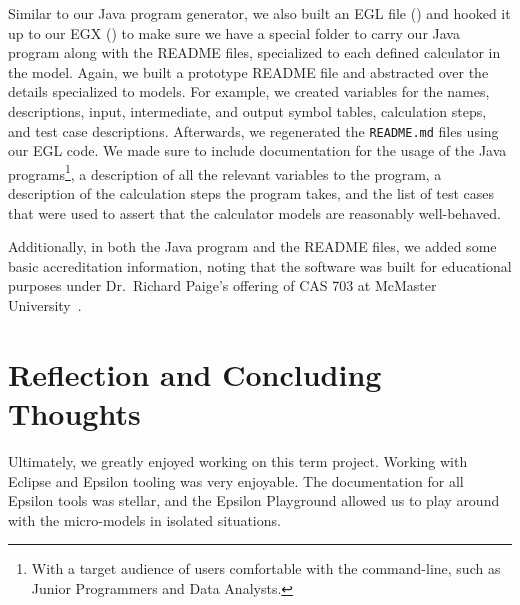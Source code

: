 \documentclass[11pt,fleqn]{article}
\begin{document}
Similar to our Java program generator, we also built an EGL file
() and hooked it up to our EGX
() to make sure we have a special folder to carry
our Java program along with the README files, specialized to each defined
calculator in the model. Again, we built a prototype README file and abstracted
over the details specialized to models. For example, we created variables for
the names, descriptions, input, intermediate, and output symbol tables,
calculation steps, and test case descriptions. Afterwards, we regenerated the
\lstinline{README.md} files using our EGL code. We made sure to include
documentation for the usage of the Java programs\footnote{With a target audience
of users comfortable with the command-line, such as Junior Programmers and Data
Analysts.}, a description of all the relevant variables to the program, a
description of the calculation steps the program takes, and the list of test
cases that were used to assert that the calculator models are reasonably
well-behaved.

Additionally, in both the Java program and the README files, we added some basic
accreditation information, noting that the software was built for educational
purposes under Dr.~Richard Paige's offering of CAS 703 at McMaster
University~\cite{Paige7032023}.

\newpage{}

\section{Reflection and Concluding Thoughts}
\label{sec:reflection-and-concluding-thoughts}

Ultimately, we greatly enjoyed working on this term project. Working with
Eclipse and Epsilon tooling was very enjoyable. The documentation for all
Epsilon tools was stellar, and the Epsilon Playground allowed us to play around
with the micro-models in isolated situations. 
\end{document}
